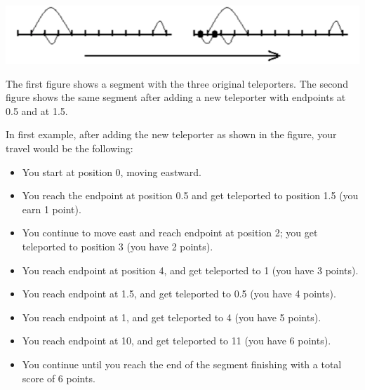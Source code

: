 \includegraphics[scale=0.8]{teleport.png}

The first figure shows a segment with the three original teleporters. The second figure shows the same segment after adding a new teleporter with endpoints at 0.5 and at 1.5. 

In first example, after adding the new teleporter as shown in the figure, your travel would be the following:
\begin{itemize}
\item You start at position 0, moving eastward.
\item You reach the endpoint at position 0.5 and get teleported to position 1.5 (you earn 1 point).
\item You continue to move east and reach endpoint at position 2; you get teleported to position 3 (you have 2 points).
\item You reach endpoint at position 4, and get teleported to 1 (you have 3 points).
\item You reach endpoint at 1.5, and get teleported to 0.5 (you have 4 points).
\item You reach endpoint at 1, and get teleported to 4 (you have 5 points).
\item You reach endpoint at 10, and get teleported to 11 (you have 6 points).
\item You continue until you reach the end of the segment finishing with a total score of 6 points.
\end{itemize}